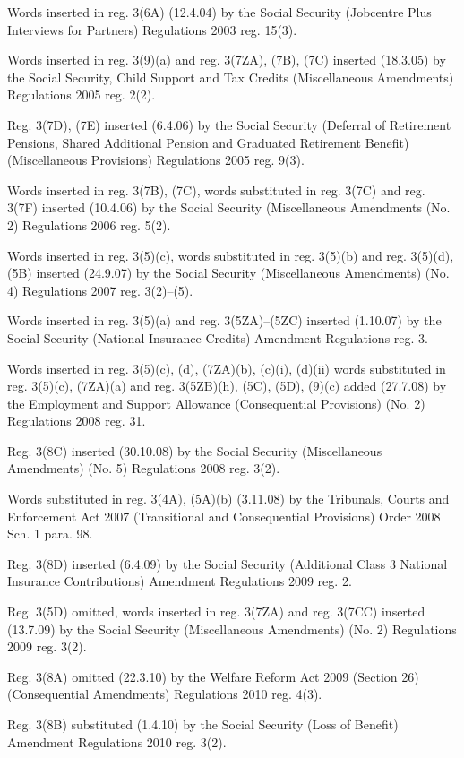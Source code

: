 \documentclass[12pt,a4paper]{article}
\begin{document}
{Words inserted in reg. 3(6A) (12.4.04) by the Social Security (Jobcentre Plus Interviews for Partners) Regulations 2003 reg. 15(3).

Words inserted in reg. 3(9)(a) and reg. 3(7ZA), (7B), (7C) inserted (18.3.05) by the Social Security, Child Support and Tax Credits (Miscellaneous Amendments) Regulations 2005 reg. 2(2).

Reg. 3(7D), (7E) inserted (6.4.06) by the Social Security (Deferral of Retirement Pensions, Shared Additional Pension and Graduated Retirement Benefit) (Miscellaneous Provisions) Regulations 2005 reg. 9(3).

Words inserted in reg. 3(7B), (7C), words substituted in reg. 3(7C) and reg. 3(7F) inserted (10.4.06) by the Social Security (Miscellaneous Amendments (No. 2) Regulations 2006 reg. 5(2).

Words inserted in reg. 3(5)(c), words substituted in reg. 3(5)(b) and reg. 3(5)(d), (5B) inserted (24.9.07) by the Social Security (Miscellaneous Amendments) (No. 4) Regulations 2007 reg. 3(2)--(5).

Words inserted in reg. 3(5)(a) and reg. 3(5ZA)--(5ZC) inserted (1.10.07) by the Social Security (National Insurance Credits) Amendment Regulations reg. 3.

Words inserted in reg. 3(5)(c), (d), (7ZA)(b), (c)(i), (d)(ii) words substituted in reg. 3(5)(c), (7ZA)(a) and reg. 3(5ZB)(h), (5C), (5D), (9)(c) added (27.7.08) by the Employment and Support Allowance (Consequential Provisions) (No. 2) Regulations 2008 reg. 31.

Reg. 3(8C) inserted (30.10.08) by the Social Security (Miscellaneous Amendments) (No. 5) Regulations 2008 reg. 3(2).

Words substituted in reg. 3(4A), (5A)(b) (3.11.08) by the Tribunals, Courts and Enforcement Act 2007 (Transitional and Consequential Provisions) Order 2008 Sch. 1 para. 98.

Reg. 3(8D) inserted (6.4.09) by the Social Security (Additional Class 3 National Insurance Contributions) Amendment Regulations 2009 reg. 2.

Reg. 3(5D) omitted, words inserted in reg. 3(7ZA) and reg. 3(7CC) inserted (13.7.09) by the Social Security (Miscellaneous Amendments) (No. 2) Regulations 2009 reg. 3(2).

Reg. 3(8A) omitted (22.3.10) by the Welfare Reform Act 2009 (Section 26) (Consequential Amendments) Regulations 2010 reg. 4(3).

Reg. 3(8B) substituted (1.4.10) by the Social Security (Loss of Benefit) Amendment Regulations 2010 reg. 3(2).

}
\end{document}
